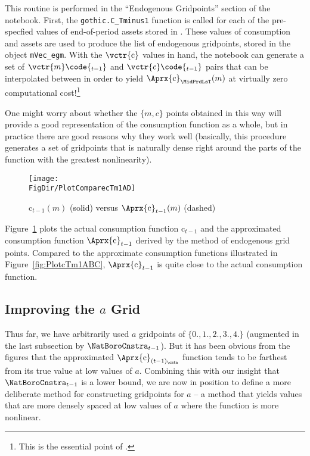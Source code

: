 \documentclass[titlepage, headings=optiontotocandhead]{Resources/texmf-local/tex/latex/econtex}
\begin{document}
This routine is performed in the ``Endogenous Gridpoints'' section of the notebook. First, the \texttt{gothic.C\_Tminus1} function is called for each of the pre-specfied values of end-of-period assets stored in . These values of consumption and assets are used to produce the list of endogenous gridpoints, stored in the object \texttt{mVec\_egm}. With the $\vctr{\mathrm{c}}$ values in hand, the notebook can generate a set of $\vctr{m}\code{_{t-1}}$ and ${\vctr{c}\code{_{t-1}}}$ pairs that can be interpolated between in order to yield $\Aprx{\mathrm{c}}_{\MidPrdLsT}(m)$ at virtually zero computational cost!\footnote{This is the essential point of \cite{carrollEGM}.} %

\hypertarget{PlotComparecTm1AD}{}
One might worry about whether the $\{{m},c\}$ points obtained in this way will provide a good representation of the consumption function as a whole, but in practice there are good reasons why they work well (basically, this procedure generates a set of gridpoints that is naturally dense right around the parts of the function with the greatest nonlinearity).
\begin{figure}
  \centerline{\texttt{[image: \\FigDir/PlotComparecTm1AD]}}
  \caption{$\mathrm{c}_{t-1}(m)$ (solid) versus $\Aprx{\mathrm{c}}_{t-1}(m)$ (dashed)}
  \label{fig:ComparecTm1AD}
\end{figure}
Figure~\ref{fig:ComparecTm1AD} plots the actual consumption function $\mathrm{c}_{t-1}$ and the approximated consumption function $\Aprx{\mathrm{c}}_{t-1}$ derived by the method of endogenous grid points. Compared to the approximate consumption functions illustrated in Figure~\ref{fig:PlotcTm1ABC}, $\Aprx{\mathrm{c}}_{t-1}$ is quite close to the actual consumption function.



\hypertarget{improving-the-a-grid}{}
\subsection{Improving the $a$ Grid}\label{subsec:improving-the-a-grid}

Thus far, we have arbitrarily used $a$ gridpoints of $\{0.,1.,2.,3.,4.\}$ (augmented in the last subsection by $\NatBoroCnstra_{t-1}$).  But it has been obvious from the figures that the approximated $\Aprx{\mathrm{c}}_{(t-1)_\cntn}$ function tends to be farthest from its true value at low values of $a$.  Combining this with our insight that $\NatBoroCnstra_{t-1}$ is a lower bound, we are now in position to define a more deliberate method for constructing gridpoints for $a$ -- a method that yields values that are more densely spaced at low values of $a$ where the function is more nonlinear.
\end{document}
